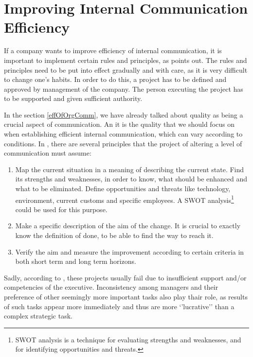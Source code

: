 \documentclass[11pt,singleside]{myfithesis2}
\begin{document}
	\section{Improving Internal Communication Efficiency}\label{improvingEff}
If a company wants to improve efficiency of internal communication, it is important to implement certain rules and principles, as \cite{intCommManag} points out. The rules and principles need to be put into effect gradually and with care, as it is very difficult to change one's habits. In order to do this, a project has to be defined and approved by management of the company. The person executing the project has to be supported and given sufficient authority. 

In the section \ref{effOfOrgComm}, we have already talked about quality as being a crucial aspect of communication. An it is the quality that we should focus on when establishing efficient internal communication, which can vary according to conditions. In \cite{intCommManag}, there are several principles that the project of altering a level of communication must assume:
\begin{enumerate}
	\item Map the current situation in a meaning of describing the current state. Find its strengths and weaknesses, in order to know, what should be enhanced and what to be eliminated. Define opportunities and threats like technology, environment, current customs and specific employees. A SWOT analysis\footnote{SWOT analysis is a technique for evaluating strengths and weaknesses, and for identifying opportunities and threats.} could be used for this purpose.
	\item Make a specific description of the aim of the change. It is crucial to exactly know the definition of done, to be able to find the way to reach it.
	\item Verify the aim and measure the improvement according to certain criteria in both short term and long term horizons.
\end{enumerate}

Sadly, according to \cite{intCommManag}, these projects usually fail due to insufficient support and/or competencies of the executive. Inconsistency among managers and their preference of other seemingly more important tasks also play thair role, as results of such tasks appear more immediately and thus are more `'lucrative'' than a complex strategic task.
\end{document}
